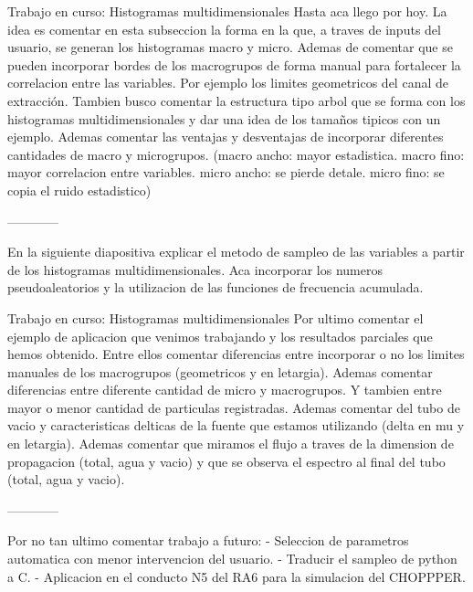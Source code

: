 \documentclass[aspectratio=169,english]{beamer}
\begin{document}
\begin{frame}{Trabajo en curso: Histogramas multidimensionales}
    Hasta aca llego por hoy. La idea es comentar en esta subseccion la forma en la que, a traves de inputs del usuario, se generan los histogramas macro y micro. Ademas de comentar que se pueden incorporar bordes de los macrogrupos de forma manual
    para fortalecer la correlacion entre las variables. Por ejemplo los limites geometricos del canal de extracción. 
    Tambien busco comentar la estructura tipo arbol que se forma con los histogramas multidimensionales y dar una idea de los tamaños tipicos con un ejemplo.
    Ademas comentar las ventajas y desventajas de incorporar diferentes cantidades de macro y microgrupos. (macro ancho: mayor estadistica. macro fino: mayor correlacion entre variables. micro ancho: se pierde detale. micro fino: se copia el ruido estadistico)

    ------------

    En la siguiente diapositiva explicar el metodo de sampleo de las variables a partir de los histogramas multidimensionales. Aca incorporar los numeros pseudoaleatorios y la utilizacion de las funciones de frecuencia acumulada.


\end{frame}

\begin{frame}{Trabajo en curso: Histogramas multidimensionales}
    Por ultimo comentar el ejemplo de aplicacion que venimos trabajando y los resultados parciales que hemos obtenido. Entre ellos comentar diferencias entre incorporar o no los limites manuales de los macrogrupos (geometricos y en letargia). Ademas comentar diferencias entre diferente cantidad de micro y macrogrupos. Y tambien entre mayor o menor cantidad de particulas registradas.
    Ademas comentar del tubo de vacio y caracteristicas delticas de la fuente que estamos utilizando (delta en mu y en letargia).
    Ademas comentar que miramos el flujo a traves de la dimension de propagacion (total, agua y vacio) y que se observa el espectro al final del tubo (total, agua y vacio).

    ------------ 
    
    Por no tan ultimo comentar trabajo a futuro:
    - Seleccion de parametros automatica con menor intervencion del usuario.
    - Traducir el sampleo de python a C.
    - Aplicacion en el conducto N5 del RA6 para la simulacion del CHOPPPER.


\end{frame}
\end{document}
